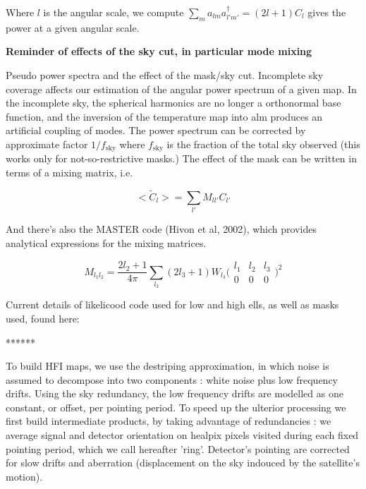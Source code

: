 \documentclass[a4paper, 11pt]{article}
\begin{document}
Where $l$ is the angular scale, we compute $\sum_m a_{lm}a^{\dagger}_{l'm'}=(2l+1)C_l$ gives the power at a given angular scale. 

\textbf{Reminder of effects of the sky cut, in particular mode mixing}


Pseudo power spectra and the effect of the mask/sky cut. Incomplete sky coverage affects our estimation of the angular power spectrum of a given map. In the incomplete sky, the spherical harmonics are no longer a orthonormal base function, and the inversion of the temperature map into alm produces an artificial coupling of modes. The power spectrum can be corrected by approximate factor $1/f_{\text{sky}}$ where $f_{\text{sky}}$ is the fraction of the total sky observed (this works only for not-so-restrictive masks.) 
The effect of the mask can be written in terms of a mixing matrix, i.e.

$$
<\tilde{C}_l>=\sum_{l'}M_{ll'}C_{l'}
$$

And there's also the MASTER code (Hivon et al, 2002), which provides analytical expressions for the mixing matrices. 

$$
M_{l_1 l_2}=\frac{2l_2+1}{4\pi}\sum_{l_3}(2l_3+1)W_{l_3}\Big(\begin{matrix}
l_1&l_2&l_3\\ 0&0&0
\end{matrix}\Big)^2
$$


Current details of likelicood code used for low and high ells, as well as masks used, found here:

******

To build HFI maps, we use the destriping approximation, in which noise is assumed to decompose into two components : white noise plus low frequency drifts. Using the sky redundancy, the low frequency drifts are modelled as one constant, or offset, per pointing period. To speed up the ulterior processing we first build intermediate products, by taking advantage of redundancies : we average signal and detector orientation on healpix pixels visited during each fixed pointing period, which we call hereafter 'ring'. Detector's pointing are corrected for slow drifts and aberration (displacement on the sky indouced by the satellite's motion).
\end{document}
